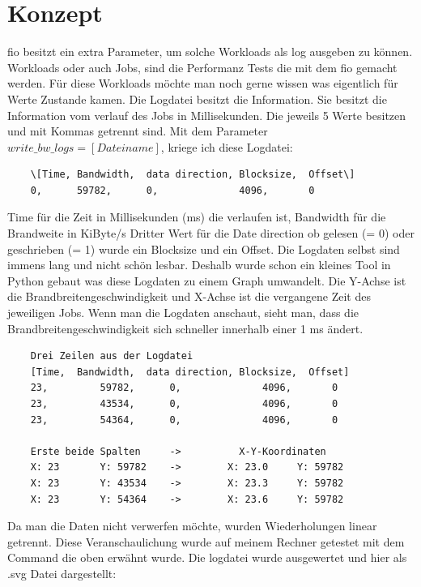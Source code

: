 \documentclass{article}
\begin{document}
\section{Konzept}
fio besitzt ein extra Parameter, um solche Workloads als log ausgeben zu können.
Workloads oder auch Jobs, sind die Performanz Tests die mit dem fio gemacht werden.
Für diese Workloads möchte man noch gerne wissen was eigentlich für Werte Zustande kamen.
Die Logdatei besitzt die Information. Sie besitzt die Information vom verlauf des Jobs in Millisekunden.
Die jeweils 5 Werte besitzen und mit Kommas getrennt sind.
Mit dem Parameter $write\_bw\_logs=[Dateiname]$, kriege ich diese Logdatei: 
\\
\begin{lstlisting}
    \[Time,	Bandwidth,	data direction, Blocksize,	Offset\]
    0, 	    59782, 		0,		        4096,		0
\end{lstlisting}
\newpage
Time für die Zeit in Millisekunden (ms) die verlaufen ist, Bandwidth für die Brandweite in KiByte/s
Dritter Wert für die Date direction ob gelesen (= 0) oder geschrieben (= 1) wurde ein Blocksize
und ein Offset. Die Logdaten selbst sind immens lang und nicht schön lesbar. Deshalb wurde schon ein kleines Tool in Python gebaut 
was diese Logdaten zu einem Graph umwandelt. 
Die Y-Achse ist die Brandbreitengeschwindigkeit und X-Achse ist die vergangene Zeit des jeweiligen Jobs.
Wenn man die Logdaten anschaut, sieht man, dass die Brandbreitengeschwindigkeit sich schneller innerhalb einer 1 ms ändert.
\\
\begin{lstlisting}
    Drei Zeilen aus der Logdatei
    [Time,	Bandwidth,	data direction, Blocksize,	Offset]
    23, 	    59782, 		0,		        4096,		0
    23, 	    43534, 		0,		        4096,		0
    23, 	    54364, 		0,		        4096,		0

    Erste beide Spalten     ->          X-Y-Koordinaten
    X: 23       Y: 59782    ->        X: 23.0     Y: 59782
    X: 23       Y: 43534    ->        X: 23.3     Y: 59782
    X: 23       Y: 54364    ->        X: 23.6     Y: 59782
\end{lstlisting}
\bigskip
Da man die Daten nicht verwerfen möchte, wurden Wiederholungen linear getrennt. 
Diese Veranschaulichung wurde auf meinem Rechner getestet mit dem
Command die oben erwähnt wurde. Die logdatei wurde ausgewertet und hier als .svg Datei dargestellt:
\end{document}
